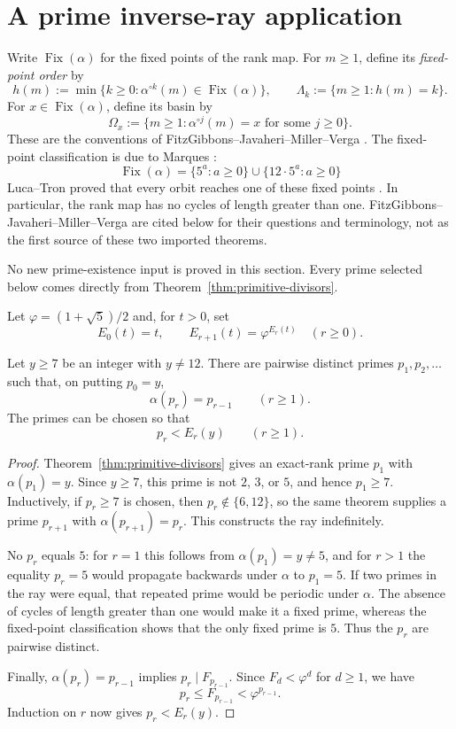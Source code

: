 \section{A prime inverse-ray application}\label{sec:inverse-dynamics}

Write $\operatorname{Fix}(\alpha)$ for the fixed points of the rank map.  For
$m\geq1$, define its \emph{fixed-point order} by
\[
 h(m):=\min\{k\geq0:\alpha^{\circ k}(m)\in
 \operatorname{Fix}(\alpha)\},
 \qquad
 \Lambda_k:=\{m\geq1:h(m)=k\}.
\]
For $x\in\operatorname{Fix}(\alpha)$, define its basin by
\[
 \Omega_x:=\{m\geq1:\alpha^{\circ j}(m)=x
 \text{ for some }j\geq0\}.
\]
These are the conventions of FitzGibbons--Javaheri--Miller--Verga
\cite{FitzGibbonsJavaheriMillerVerga2025Dynamics}. The fixed-point
classification is due to Marques \cite{Marques2012OrderAppearance}:
\[
 \operatorname{Fix}(\alpha)=\{5^a:a\geq0\}
 \cup\{12\cdot5^a:a\geq0\}
\]
Luca--Tron proved that every orbit reaches one of these fixed points
\cite{LucaTron2015SelfFibonacciDivisors}. In particular, the rank map has no
cycles of length greater than one. FitzGibbons--Javaheri--Miller--Verga are
cited below for their questions and terminology, not as the first source of
these two imported theorems.

No new prime-existence input is proved in this section. Every prime selected
below comes directly from Theorem~\ref{thm:primitive-divisors}.

Let $\varphi=(1+\sqrt5)/2$ and, for $t>0$, set
\[
 E_0(t)=t,\qquad E_{r+1}(t)=\varphi^{E_r(t)}\quad(r\geq0).
\]

\begin{theorem}\label{thm:prime-inverse-rays}
Let $y\geq7$ be an integer with $y\neq12$.  There are pairwise distinct
primes $p_1,p_2,\ldots$ such that, on putting $p_0=y$,
\[
 \alpha(p_r)=p_{r-1}\qquad(r\geq1).
\]
The primes can be chosen so that
\[
 p_r<E_r(y)\qquad(r\geq1).
\]
\end{theorem}

\begin{proof}
Theorem~\ref{thm:primitive-divisors} gives an exact-rank prime $p_1$ with
$\alpha(p_1)=y$.  Since $y\geq7$, this prime is not $2$, $3$, or $5$, and
hence $p_1\geq7$.  Inductively, if $p_r\geq7$ is chosen, then
$p_r\notin\{6,12\}$, so the same theorem supplies a prime $p_{r+1}$ with
$\alpha(p_{r+1})=p_r$.  This constructs the ray indefinitely.

No $p_r$ equals $5$: for $r=1$ this follows from $\alpha(p_1)=y\neq5$, and
for $r>1$ the equality $p_r=5$ would propagate backwards under $\alpha$ to
$p_1=5$.  If two primes in the ray were equal, that repeated prime would be
periodic under $\alpha$.  The absence of cycles of length greater than one
would make it a fixed prime, whereas the fixed-point classification shows
that the only fixed prime is $5$.  Thus the $p_r$ are pairwise distinct.

Finally, $\alpha(p_r)=p_{r-1}$ implies $p_r\mid F_{p_{r-1}}$.  Since
$F_d<\varphi^d$ for $d\geq1$, we have
\[
 p_r\leq F_{p_{r-1}}<\varphi^{p_{r-1}}.
\]
Induction on $r$ now gives $p_r<E_r(y)$.
\end{proof}

